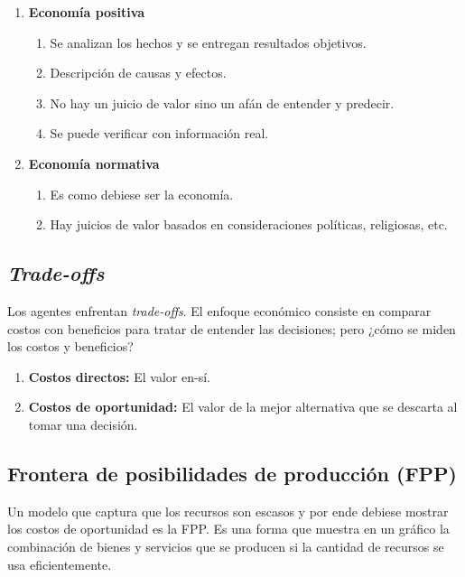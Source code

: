\documentclass{report}
\begin{document}
\begin{enumerate}
\item \textbf{Economía positiva}
\begin{enumerate}
\item Se analizan los hechos y se entregan resultados objetivos.
\item Descripción de causas y efectos.
\item No hay un juicio de valor sino un afán de entender y predecir.
\item Se puede verificar con información real.
\end{enumerate}
\item \textbf{Economía normativa}
\begin{enumerate}
\item Es como debiese ser la economía.
\item Hay juicios de valor basados en consideraciones políticas, religiosas, etc.
\end{enumerate}
\end{enumerate}

\subsection{\textit{Trade-offs}}

Los agentes enfrentan \textit{trade-offs}. El enfoque económico consiste en comparar costos con beneficios para tratar de entender las decisiones; pero ¿cómo se miden los costos y beneficios?
\begin{enumerate}
\item \textbf{Costos directos:} El valor en-sí.
\item \textbf{Costos de oportunidad:} El valor de la mejor alternativa que se descarta al tomar una decisión.
\end{enumerate}

\subsection{Frontera de posibilidades de producción (FPP)}

Un modelo que captura que los recursos son escasos y por ende debiese mostrar los costos de oportunidad es la FPP. Es una forma que muestra en un gráfico la combinación de bienes y servicios que se producen si la cantidad de recursos se usa eficientemente.\\
\end{document}

